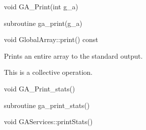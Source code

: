 \documentclass[12pt]{article}
\begin{document}

\begin{capi}
\begin{ccode}
void GA_Print(int g_a)
\end{ccode}
\begin{funcargs}
\end{funcargs}
\end{capi}

\begin{fapi}
\begin{fcode}
subroutine ga_print(g_a)   
\end{fcode}
\begin{funcargs}
\end{funcargs}
\end{fapi}

\begin{cxxapi}
\begin{cxxcode}
void GlobalArray::print() const
\end{cxxcode}
\end{cxxapi}


\gcoll

\begin{desc}

Prints an entire array to the standard output.

This is a collective operation.
\end{desc}


\begin{capi}
\begin{ccode}
void GA_Print_stats()
\end{ccode}
\end{capi}

\begin{fapi}
\begin{fcode}
subroutine ga_print_stats()
\end{fcode}
\end{fapi}

\begin{cxxapi}
\begin{cxxcode}
void GAServices::printStats()
\end{cxxcode}
\end{cxxapi}
\end{document}
